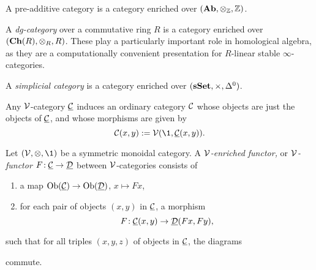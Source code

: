 \begin{example}
	A pre-additive category is a category enriched over \((\mathbf{Ab},\otimes_{\mathbb{Z}},\mathbb{Z})\).
\end{example}
\begin{example}
	A \emph{dg-category} over a commutative ring \(R\) is a category enriched over \((\mathbf{Ch}(R),\otimes_R,R)\). These play a particularly important role in homological algebra,
	as they are a computationally convenient presentation for \(R\)-linear stable \(\infty\)-categories.
\end{example}
\begin{example}
	A \emph{simplicial category} is a category enriched over \((\mathbf{sSet},\times,\Delta^0)\).
\end{example}
\begin{remark}
	Any \(\mathcal{V}\)-category \(\underline{\mathcal{C}}\) induces an ordinary category \(\mathcal{C}\) whose objects are just the objects of \(\underline{\mathcal{C}}\), and whose morphisms are given by
	\[ \calC(x,y) := \calV(\1,\underline\calC(x,y)). \]
\end{remark}
\begin{definition}
	Let \((\calV,\otimes,\1)\) be a symmetric monoidal category. A \(\mathcal{V}\)\emph{-enriched functor,} or \(\mathcal{V}\)\emph{-functor} \(F\!:\underline{\mathcal{C}}\to\underline{\mathcal{D}}\) between
	\(\mathcal{V}\)-categories consists of
	\begin{enumerate}[label=(\arabic*)]
	\item a map \(\operatorname{Ob}(\underline{\mathcal{C}})\to\operatorname{Ob}(\underline{\mathcal{D}})\), \(x\mapsto Fx\),
	\item for each pair of objects \((x,y)\) in \(\underline{\mathcal{C}}\), a morphism
	\[ F\!:\underline{\mathcal{C}}(x,y)\to\underline{\mathcal{D}}(Fx,Fy), \]
	\end{enumerate}
	such that for all triples \((x,y,z)\) of objects in \(\underline{\mathcal{C}}\), the diagrams
	\begin{center}
	\quad
	\end{center}
	commute.
\end{definition}

